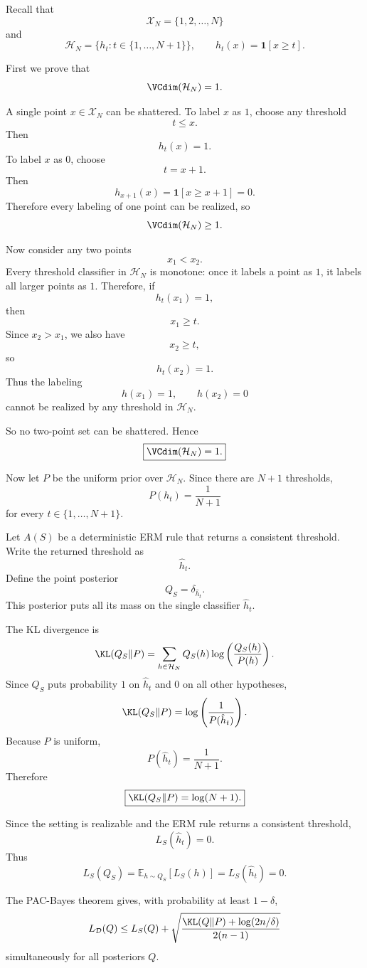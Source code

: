 \documentclass[11pt]{article}
\begin{document}
\begin{solutionbox}

Recall that
\[
\mathcal X_N=\{1,2,\dots,N\}
\]
and
\[
\mathcal H_N=\{h_t:t\in\{1,\dots,N+1\}\},
\qquad
h_t(x)=\mathbf 1[x\ge t].
\]

First we prove that
\[
\VCdim(\mathcal H_N)=1.
\]

A single point $x\in\mathcal X_N$ can be shattered. To label $x$ as $1$, choose any threshold
\[
t\le x.
\]
Then
\[
h_t(x)=1.
\]
To label $x$ as $0$, choose
\[
t=x+1.
\]
Then
\[
h_{x+1}(x)=\mathbf 1[x\ge x+1]=0.
\]
Therefore every labeling of one point can be realized, so
\[
\VCdim(\mathcal H_N)\ge 1.
\]

Now consider any two points
\[
x_1<x_2.
\]
Every threshold classifier in $\mathcal H_N$ is monotone: once it labels a point as $1$, it labels all larger points as $1$. Therefore, if
\[
h_t(x_1)=1,
\]
then
\[
x_1\ge t.
\]
Since $x_2>x_1$, we also have
\[
x_2\ge t,
\]
so
\[
h_t(x_2)=1.
\]
Thus the labeling
\[
h(x_1)=1,
\qquad
h(x_2)=0
\]
cannot be realized by any threshold in $\mathcal H_N$.

So no two-point set can be shattered. Hence
\[
\boxed{
\VCdim(\mathcal H_N)=1.
}
\]

Now let $P$ be the uniform prior over $\mathcal H_N$. Since there are $N+1$ thresholds,
\[
P(h_t)=\frac{1}{N+1}
\]
for every $t\in\{1,\dots,N+1\}$.

Let $A(S)$ be a deterministic ERM rule that returns a consistent threshold. Write the returned threshold as
\[
\hat h_t.
\]
Define the point posterior
\[
Q_S=\delta_{\hat h_t}.
\]
This posterior puts all its mass on the single classifier $\hat h_t$.

The KL divergence is
\[
\KL(Q_S\|P)
=
\sum_{h\in\mathcal H_N}
Q_S(h)\log\left(\frac{Q_S(h)}{P(h)}\right).
\]
Since $Q_S$ puts probability $1$ on $\hat h_t$ and $0$ on all other hypotheses,
\[
\KL(Q_S\|P)
=
\log\left(\frac{1}{P(\hat h_t)}\right).
\]
Because $P$ is uniform,
\[
P(\hat h_t)=\frac{1}{N+1}.
\]
Therefore
\[
\boxed{
\KL(Q_S\|P)=\log(N+1).
}
\]

Since the setting is realizable and the ERM rule returns a consistent threshold,
\[
L_S(\hat h_t)=0.
\]
Thus
\[
L_S(Q_S)
=
\mathbb E_{h\sim Q_S}[L_S(h)]
=
L_S(\hat h_t)
=
0.
\]

The PAC-Bayes theorem gives, with probability at least $1-\delta$,
\[
L_{\mathcal D}(Q)
\le
L_S(Q)
+
\sqrt{
\frac{
\KL(Q\|P)+\log(2n/\delta)
}{
2(n-1)
}
}
\]
simultaneously for all posteriors $Q$.


\end{solutionbox}
\end{document}
